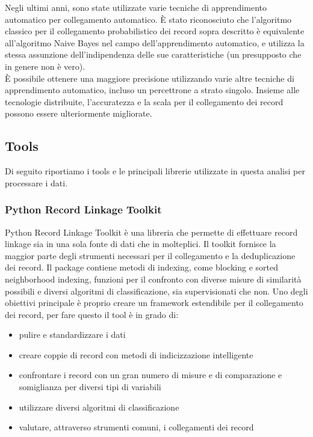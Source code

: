\documentclass[a4paper,12pt]{article}
\begin{document}
\begin{description}[align=left]
	\item[Machine learning] Negli ultimi anni, sono state utilizzate varie tecniche di apprendimento automatico per collegamento automatico. È stato riconosciuto che l'algoritmo classico per il collegamento probabilistico dei record sopra descritto è equivalente all'algoritmo Naive Bayes nel campo dell'apprendimento automatico, e utilizza la stessa assunzione dell'indipendenza delle sue caratteristiche (un presupposto che in genere non è vero).\\È possibile ottenere una maggiore precisione utilizzando varie altre tecniche di apprendimento automatico, incluso un percettrone a strato singolo. Insieme alle tecnologie distribuite, l'accuratezza e la scala per il collegamento dei record possono essere ulteriormente migliorate.	
\end{description}

\subsection{Tools}
Di seguito riportiamo i tools e le principali librerie utilizzate in questa analisi per processare i dati.

\subsubsection{Python Record Linkage Toolkit}
Python Record Linkage Toolkit è una libreria che permette di effettuare record linkage sia in una sola fonte di dati che in molteplici. Il toolkit fornisce la maggior parte degli strumenti necessari per il collegamento e la deduplicazione dei record.
Il package contiene metodi di indexing, come blocking e sorted neighborhood indexing, funzioni per il confronto con diverse misure di similarità possibili e diversi algoritmi di classificazione, sia supervisionati che non. 
Uno degli obiettivi principale è proprio creare un framework estendibile per il collegamento dei record, per fare questo il tool è in grado di:
\newpage
\begin{itemize}
\item pulire e standardizzare i dati
\item creare coppie di record con metodi di indicizzazione intelligente
\item confrontare i record con un gran numero di misure e di comparazione e somiglianza per diversi tipi di variabili
\item utilizzare diversi algoritmi di classificazione
\item valutare, attraverso strumenti comuni, i collegamenti dei record
\end{itemize} 
\end{document}
